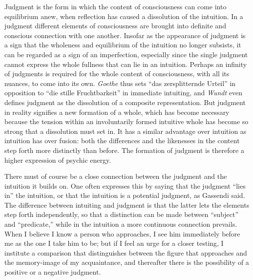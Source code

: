 \documentclass[12pt,a4paper]{book}
\newcommand{\opage}[1]{\marginnote{\footnotesize\textit{[#1]}}}
\begin{document}
Judgment is the form in which the content of consciousness can come into
equilibrium anew, when reflection has caused a dissolution of the
intuition. In a judgment different elements of consciousness are brought
into definite and conscious connection with one another. Insofar as the
appearance of judgment is a sign that the wholeness and equilibrium of the
intuition no longer subsists, it can be regarded as a sign of an
imperfection, especially since the single judgment cannot express the
whole fullness that can lie in an intuition. Perhaps an infinity of
judgments is required for the whole content of consciousness, with all its
nuances, to come into its own. \emph{Goethe} thus sets ``das
zersplitternde Urteil'' in opposition to ``die stille Fruchtbarkeit'' in
immediate intuiting, and \emph{Wundt} even defines judgment as the
dissolution of a composite representation. But judgment in reality signifies
a new formation of a whole, which has become necessary because the tension
within an involuntarily formed intuitive whole has become so strong that a
dissolution must set in. It has a similar advantage over intuition as
intuition has over fusion: both the differences and the likenesses in the
content step forth more distinctly than before. The formation of judgment
is therefore a higher expression of psychic energy.

There must of course be a close connection between the judgment and the
intuition it builds on. One often expresses this by saying that the
judgment ``lies in'' the intuition, or that the intuition is a potential
judgment, as Gassendi said. The difference between intuiting and judgment
is that the latter lets the elements step forth independently, so that a
distinction can be made between ``subject'' and ``predicate,'' while in the
intuition a more continuous connection prevails. When I believe I \opage{58}know a
person who approaches, I see him immediately before me as the one I take
him to be; but if I feel an urge for a closer testing, I institute a
comparison that distinguishes between the figure that approaches and the
memory-image of my acquaintance, and thereafter there is the possibility of
a positive or a negative judgment.
\end{document}
